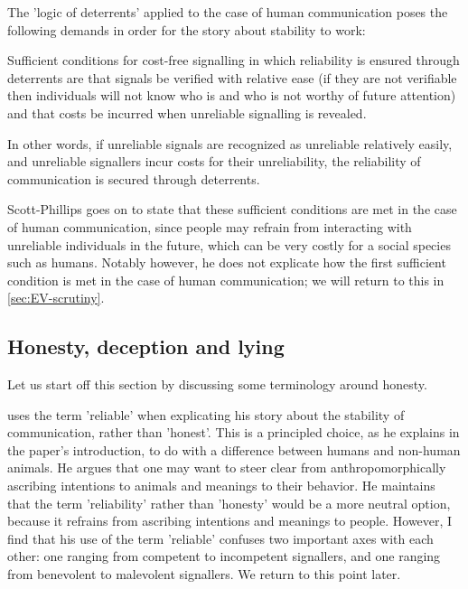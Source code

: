 The 'logic of deterrents' applied to the case of human communication poses the following demands in order for the story about stability to work:
\begin{quoting}
    Sufficient conditions for cost-free signalling in which reliability is ensured through deterrents are that signals be verified with relative ease (if they are not verifiable then individuals will not know who is and who is not worthy of future attention) and that costs be incurred when unreliable signalling is revealed.
    \hfill \citep[p.~?]{Scott-Phillips08}
\end{quoting}
In other words, if unreliable signals are recognized as unreliable relatively easily, and unreliable signallers incur costs for their unreliability, the reliability of communication is secured through deterrents.

Scott-Phillips goes on to state that these sufficient conditions are met in the case of human communication, since people may refrain from interacting with unreliable individuals in the future, which can be very costly for a social species such as humans.
Notably however, he does not explicate how the first sufficient condition is met in the case of human communication; we will return to this in \cref{sec:EV-scrutiny}.

\subsection{Honesty, deception and lying}





Let us start off this section by discussing some terminology around honesty.

\citet{Scott-Phillips08} uses the term 'reliable' when explicating his story about the stability of communication, rather than 'honest'. This is a principled choice, as he explains in the paper's introduction, to do with a difference between humans and non-human animals. He argues that one may want to steer clear from anthropomorphically ascribing intentions to animals and meanings to their behavior. He maintains that the term 'reliability' rather than 'honesty' would be a more neutral option, because it refrains from ascribing intentions and meanings to people. 
However, I find that his use of the term 'reliable' confuses two important axes with each other: one ranging from competent to incompetent signallers, and one ranging from benevolent to malevolent signallers. We return to this point later.


